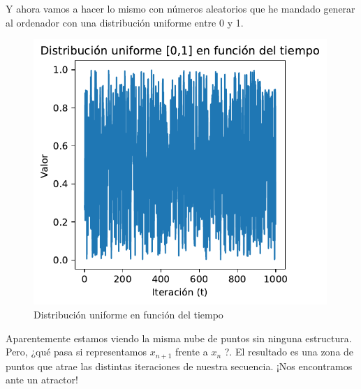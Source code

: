 \documentclass[
  10pt,
  a4paper,
  DIV=11,
  numbers=noendperiod,
  open=any]{scrreprt}
\numberwithin{equation}{chapter}
\numberwithin{equation}{section}
\renewcommand{\[}{\begin{equation}}
\renewcommand{\]}{\end{equation}}
\begin{document}
Y ahora vamos a hacer lo mismo con números aleatorios que he mandado
generar al ordenador con una distribución uniforme entre 0 y 1.


\begin{figure}[h]
  \centering
  \includegraphics[width=0.99\textwidth]{04-clima/atractor_files/figure-pdf/cell-3-output-1.pdf}
  \caption{Distribución uniforme en función del tiempo}
\end{figure}

Aparentemente estamos viendo la misma nube de puntos sin ninguna
estructura. Pero, ¿qué pasa si representamos \(x_{n+1}\) frente a
\(x_n\) ?. El resultado es una zona de puntos que atrae las distintas
iteraciones de nuestra secuencia. ¡Nos encontramos ante un atractor!
\end{document}
